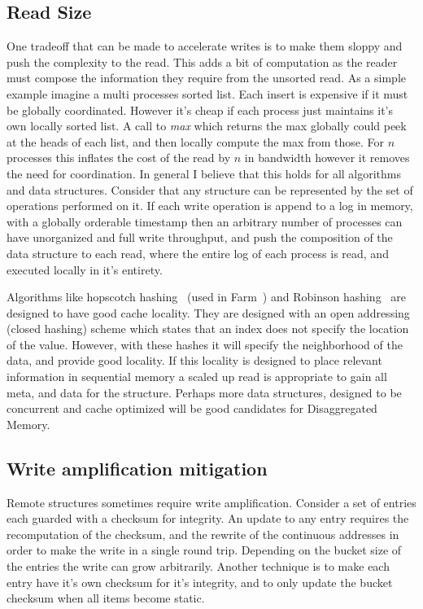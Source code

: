 \subsection{Read Size} 
\label{sec:readsize}
One tradeoff that can be made to accelerate writes is to make
them sloppy and push the complexity to the read. This adds a bit of computation
as the reader must compose the information they require from the unsorted read.
As a simple example imagine a multi processes sorted list. Each insert is
expensive if it must be globally coordinated. However it's cheap if each process
just maintains it's own locally sorted list. A call to \textit{max} which
returns the max globally could peek at the heads of each list, and then locally
compute the max from those. For $n$ processes this inflates the cost of the read
by $n$ in bandwidth however it removes the need for coordination. In general I
believe that this holds for all algorithms and data structures. Consider that any
structure can be represented by the set of operations performed on it. If each
write operation is append to a log in memory, with a globally orderable
timestamp then an arbitrary number of processes can have unorganized and full
write throughput, and push the composition of the data structure to each read,
where the entire log of each process is read, and executed locally in it's
entirety.

Algorithms like hopscotch hashing~\cite{hopscotch} (used in Farm~\cite{farm})
and Robinson hashing~\cite{robinhood} are designed to have good cache locality.
They are designed with an open addressing (closed hashing) scheme which states
that an index does not specify the location of the value. However, with these
hashes it will specify the neighborhood of the data, and provide good locality.
If this locality is designed to place relevant information in sequential memory
a scaled up read is appropriate to gain all meta, and data for the structure.
Perhaps more data structures, designed to be concurrent and cache optimized will
be good candidates for Disaggregated Memory.

\subsection{Write amplification mitigation}
\label{sec:write-amplification}
Remote structures sometimes require write
amplification. Consider a set of entries each guarded with a checksum for
integrity. An update to any entry requires the recomputation of the checksum,
and the rewrite of the continuous addresses in order to make the write in a
single round trip. Depending on the bucket size of the entries the write can
grow arbitrarily. Another technique is to make each entry have it's own checksum
for it's integrity, and to only update the bucket checksum when all items become
static.

